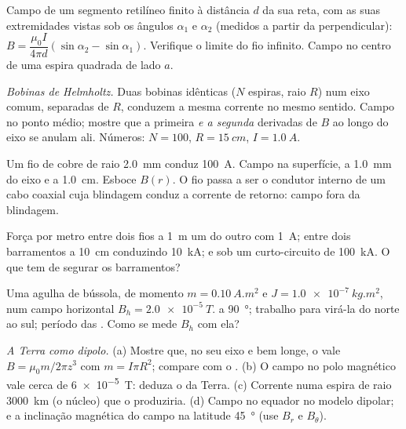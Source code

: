 \begin{exercise}[$\star\star$]\label{exo:b1:magnetostatics:5}
Campo de um segmento retilíneo finito à distância $d$ da sua reta, com as suas
extremidades vistas sob os ângulos $\alpha_1$ e $\alpha_2$ (medidos a partir da
perpendicular): $B = \dfrac{\mu_0I}{4\pi d}(\sin\alpha_2 - \sin\alpha_1)$. Verifique
o limite do fio infinito. Campo no centro de uma espira quadrada de lado
$a$.
\end{exercise}

\begin{exercise}[$\star\star$]\label{exo:b1:magnetostatics:6}
\emph{Bobinas de Helmholtz.} Duas bobinas idênticas ($N$ espiras, raio $R$) num
eixo comum, separadas de $R$, conduzem a mesma corrente no mesmo
sentido. Campo no ponto médio; mostre que a primeira \emph{e a segunda}
derivadas de $B$ ao longo do eixo se anulam ali. Números: $N = 100$,
$R = \qty{15}{cm}$, $I = \qty{1.0}{A}$.
\end{exercise}

\begin{exercise}[$\star\star$]\label{exo:b1:magnetostatics:7}
Um fio de cobre de raio \qty{2.0}{mm} conduz \qty{100}{A}. Campo na
superfície, a \qty{1.0}{mm} do eixo e a \qty{1.0}{cm}. Esboce $B(r)$.
O fio passa a ser o condutor interno de um cabo coaxial cuja blindagem
conduz a corrente de retorno: campo fora da blindagem.
\end{exercise}

\begin{exercise}[$\star\star$]\label{exo:b1:magnetostatics:8}
Força por metro entre dois fios a \qty{1}{m} um do outro com \qty{1}{A}; entre
dois barramentos a \qty{10}{cm} conduzindo \qty{10}{kA}; e sob um curto-circuito
de \qty{100}{kA}. O que tem de segurar os barramentos?
\end{exercise}

\begin{exercise}[$\star\star$]\label{exo:b1:magnetostatics:9}
Uma agulha de bússola, de momento $m = \qty{0.10}{A.m^2}$ e 
$J = \qty{1.0e-7}{kg.m^2}$, num campo horizontal $B_h = \qty{2.0e-5}{T}$.
 a \qty{90}{\degree}; trabalho para virá-la do norte ao sul; período
das . Como se mede $B_h$ com ela?
\end{exercise}

\begin{exercise}[$\star\star\star$]\label{exo:b1:magnetostatics:10}
\emph{A Terra como dipolo.} (a) Mostre que, no seu eixo e bem longe, o
 vale $B = \mu_0m/2\pi z^3$ com $m = I\pi R^2$; compare com o
. (b) O campo no polo magnético vale cerca de
\qty{6e-5}{T}: deduza o  da Terra. (c) Corrente numa espira
de raio \qty{3000}{km} (o núcleo) que o produziria. (d) Campo no
equador no modelo dipolar; e a inclinação magnética do campo na
latitude \qty{45}{\degree} (use $B_r$ e $B_\theta$).
\end{exercise}


